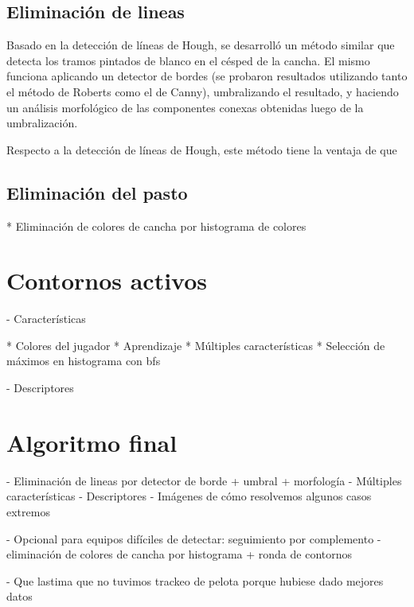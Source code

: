 
\subsection{Eliminación de lineas}

Basado en la detección de líneas de Hough, se desarrolló un método similar que
detecta los tramos pintados de blanco en el césped de la cancha. El mismo
funciona aplicando un detector de bordes (se probaron resultados utilizando
tanto el método de Roberts como el de Canny), umbralizando el resultado, y
haciendo un análisis morfológico de las componentes conexas obtenidas luego de
la umbralización.

Respecto a la detección de líneas de Hough, este método tiene la ventaja de que

\subsection{Eliminación del pasto}
  * Eliminación de colores de cancha por histograma de colores

\section{Contornos activos}
\label{sec:ac-extension}

- Características

  * Colores del jugador
  * Aprendizaje
  * Múltiples características
  * Selección de máximos en histograma con bfs

- Descriptores

\section{Algoritmo final}
\label{sec:alg-final}

- Eliminación de lineas por detector de borde + umbral + morfología
- Múltiples características
- Descriptores
- Imágenes de cómo resolvemos algunos casos extremos

- Opcional para equipos difíciles de detectar: seguimiento por complemento
  - eliminación de colores de cancha por histograma + ronda de contornos

- Que lastima que no tuvimos trackeo de pelota porque hubiese dado mejores datos
